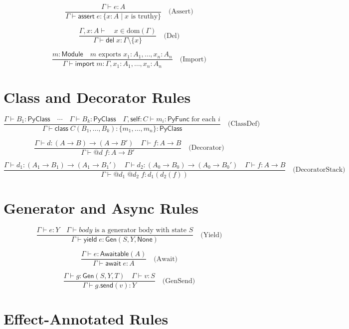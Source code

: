 \documentclass[11pt,a4paper]{report}
\theoremstyle{definition}
\theoremstyle{plain}
\newcommand{\PyClass}{\mathsf{PyClass}}
\newcommand{\PyFunc}{\mathsf{PyFunc}}
\begin{document}
\[
  \frac{
    \Gamma \vdash e : A
  }{
    \Gamma \vdash \mathsf{assert}\; e : \{x : A \mid x\text{ is truthy}\}
  } \quad \text{(Assert)}
\]

\[
  \frac{
    \Gamma, x : A \vdash \quad x \in \mathrm{dom}(\Gamma)
  }{
    \Gamma \vdash \mathsf{del}\; x : \Gamma \setminus \{x\}
  } \quad \text{(Del)}
\]

\[
  \frac{
    m : \mathsf{Module} \quad
    m\text{ exports } x_1 : A_1, \ldots, x_n : A_n
  }{
    \Gamma \vdash \mathsf{import}\; m : \Gamma, x_1 : A_1, \ldots, x_n : A_n
  } \quad \text{(Import)}
\]

\section{Class and Decorator Rules}

\[
  \frac{
    \Gamma \vdash B_1 : \PyClass \quad \cdots \quad \Gamma \vdash B_k : \PyClass \quad
    \Gamma, \mathsf{self} : C \vdash m_i : \PyFunc \;\text{for each } i
  }{
    \Gamma \vdash \mathsf{class}\; C(B_1, \ldots, B_k) : \{m_1, \ldots, m_n\} : \PyClass
  } \quad \text{(ClassDef)}
\]

\[
  \frac{
    \Gamma \vdash d : (A \to B) \to (A \to B') \quad
    \Gamma \vdash f : A \to B
  }{
    \Gamma \vdash @d\; f : A \to B'
  } \quad \text{(Decorator)}
\]

\[
  \frac{
    \Gamma \vdash d_1 : (A_1 \to B_1) \to (A_1 \to B_1') \quad
    \Gamma \vdash d_2 : (A_0 \to B_0) \to (A_0 \to B_0') \quad
    \Gamma \vdash f : A \to B
  }{
    \Gamma \vdash @d_1\; @d_2\; f : d_1(d_2(f))
  } \quad \text{(DecoratorStack)}
\]

\section{Generator and Async Rules}

\[
  \frac{
    \Gamma \vdash e : Y \quad
    \Gamma \vdash \mathit{body}\text{ is a generator body with state } S
  }{
    \Gamma \vdash \mathsf{yield}\; e : \mathsf{Gen}(S, Y, \mathsf{None})
  } \quad \text{(Yield)}
\]

\[
  \frac{
    \Gamma \vdash e : \mathsf{Awaitable}(A)
  }{
    \Gamma \vdash \mathsf{await}\; e : A
  } \quad \text{(Await)}
\]

\[
  \frac{
    \Gamma \vdash g : \mathsf{Gen}(S, Y, T) \quad
    \Gamma \vdash v : S
  }{
    \Gamma \vdash g.\mathsf{send}(v) : Y
  } \quad \text{(GenSend)}
\]

\section{Effect-Annotated Rules}
\end{document}
